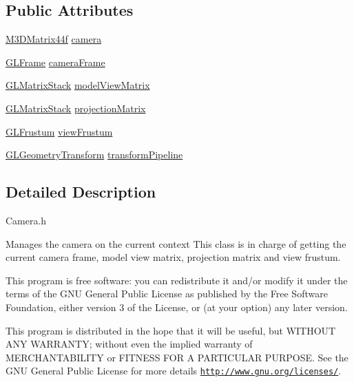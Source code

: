 \subsection*{Public Attributes}
\begin{DoxyCompactItemize}
\item 
\hyperlink{math3d_8h_a1e8690467d81d5ed97c5ecc3a144a4ac}{M3\-D\-Matrix44f} \hyperlink{class_camera_a13d3701406fb54feeb9d1a7c9055d23d}{camera}
\item 
\hyperlink{class_g_l_frame}{G\-L\-Frame} \hyperlink{class_camera_a4f30974092fec6f63a1aa5902d213f1a}{camera\-Frame}
\item 
\hyperlink{class_g_l_matrix_stack}{G\-L\-Matrix\-Stack} \hyperlink{class_camera_aa9ebe4548ff6926ca2b23808f03f1c2f}{model\-View\-Matrix}
\item 
\hyperlink{class_g_l_matrix_stack}{G\-L\-Matrix\-Stack} \hyperlink{class_camera_ac673d4053983e72dec3b48187441a3c6}{projection\-Matrix}
\item 
\hyperlink{class_g_l_frustum}{G\-L\-Frustum} \hyperlink{class_camera_a0fc284a14ea8c5553dd5d88b34c18c36}{view\-Frustum}
\item 
\hyperlink{class_g_l_geometry_transform}{G\-L\-Geometry\-Transform} \hyperlink{class_camera_a262ad4e818859be2f115aac8320140d3}{transform\-Pipeline}
\end{DoxyCompactItemize}


\subsection{Detailed Description}
Camera.\-h

Manages the camera on the current context This class is in charge of getting the current camera frame, model view matrix, projection matrix and view frustum.

This program is free software\-: you can redistribute it and/or modify it under the terms of the G\-N\-U General Public License as published by the Free Software Foundation, either version 3 of the License, or (at your option) any later version.

This program is distributed in the hope that it will be useful, but W\-I\-T\-H\-O\-U\-T A\-N\-Y W\-A\-R\-R\-A\-N\-T\-Y; without even the implied warranty of M\-E\-R\-C\-H\-A\-N\-T\-A\-B\-I\-L\-I\-T\-Y or F\-I\-T\-N\-E\-S\-S F\-O\-R A P\-A\-R\-T\-I\-C\-U\-L\-A\-R P\-U\-R\-P\-O\-S\-E. See the G\-N\-U General Public License for more details \href{http://www.gnu.org/licenses/}{\tt http\-://www.\-gnu.\-org/licenses/}. 

